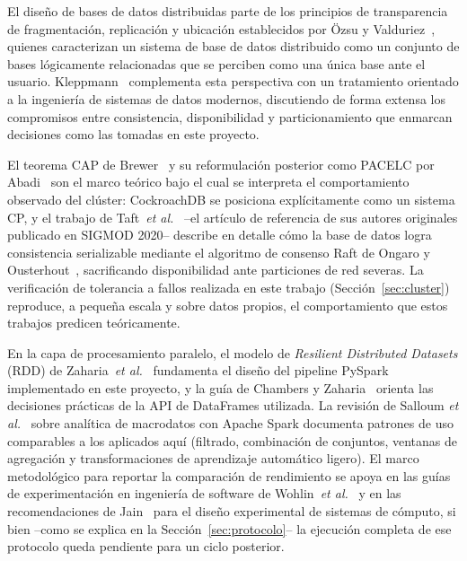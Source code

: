\documentclass[10pt,twocolumn]{article}
\begin{document}
El diseño de bases de datos distribuidas parte de los principios de
transparencia de fragmentación, replicación y ubicación establecidos por
Özsu y Valduriez~\cite{ozsu2020}, quienes caracterizan un sistema de base de
datos distribuido como un conjunto de bases lógicamente relacionadas que se
perciben como una única base ante el usuario. Kleppmann~\cite{kleppmann2022}
complementa esta perspectiva con un tratamiento orientado a la ingeniería de
sistemas de datos modernos, discutiendo de forma extensa los compromisos
entre consistencia, disponibilidad y particionamiento que enmarcan
decisiones como las tomadas en este proyecto.

El teorema CAP de Brewer~\cite{lee2023cap} y su reformulación posterior como
PACELC por Abadi~\cite{lee2023cap} son el marco teórico bajo el cual se
interpreta el comportamiento observado del clúster: CockroachDB se posiciona
explícitamente como un sistema CP, y el trabajo de
Taft~\emph{et al.}~\cite{taft2020} --el artículo de referencia de sus
autores originales publicado en SIGMOD 2020-- describe en detalle cómo la
base de datos logra consistencia serializable mediante el algoritmo de
consenso Raft de Ongaro y Ousterhout~\cite{huang2020tidb}, sacrificando
disponibilidad ante particiones de red severas. La verificación de
tolerancia a fallos realizada en este trabajo (Sección~\ref{sec:cluster})
reproduce, a pequeña escala y sobre datos propios, el comportamiento que
estos trabajos predicen teóricamente.

En la capa de procesamiento paralelo, el modelo de \emph{Resilient
Distributed Datasets} (RDD) de Zaharia~\emph{et al.}~\cite{wang2022spark}
fundamenta el diseño del pipeline PySpark implementado en este proyecto, y
la guía de Chambers y Zaharia~\cite{wang2022spark} orienta las decisiones
prácticas de la API de DataFrames utilizada. La revisión de Salloum
\emph{et al.}~\cite{wang2022spark} sobre analítica de macrodatos con Apache
Spark documenta patrones de uso comparables a los aplicados aquí (filtrado,
combinación de conjuntos, ventanas de agregación y transformaciones de
aprendizaje automático ligero). El marco metodológico para reportar la
comparación de rendimiento se apoya en las guías de experimentación en
ingeniería de software de Wohlin~\emph{et al.}~\cite{verdecchia2023} y en las
recomendaciones de Jain~\cite{baltes2022sampling} para el diseño experimental de
sistemas de cómputo, si bien --como se explica en la
Sección~\ref{sec:protocolo}-- la ejecución completa de ese protocolo queda
pendiente para un ciclo posterior.
\end{document}
